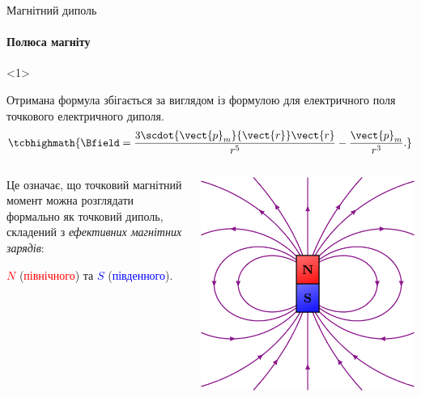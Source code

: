 \documentclass{beamer}
\begin{document}
\begin{frame}{Магнітний диполь}{}
	\framesubtitle<1>{Полюса магніту}
	\begin{onlyenv}
		\begin{block}{}
			Отримана формула збігається за виглядом із формулою для електричного поля точкового електричного диполя.
			\begin{equation*}
				\tcbhighmath{\Bfield = \frac{3\scdot{\vect{p}_m}{\vect{r}}\vect{r}}{r^5} - \frac{\vect{p}_m}{r^3}.}
			\end{equation*}
		\end{block}
		\begin{columns}
			\begin{column}{0.7\linewidth}
				\begin{block}{}\justifying
					Це означає, що точковий
					магнітний момент можна розглядати формально як точковий диполь, складений з \alert{\emph{ефективних магнітних зарядів}}:
					\begin{center}
						\textcolor{red}{$N$} (\textcolor{red}{північного}) та \textcolor{blue}{$S$} (\textcolor{blue}{південного}).
					\end{center}
				\end{block}
			\end{column}
			\begin{column}{0.3\linewidth}\centering
				\includegraphics[width=\linewidth]{magdipole}

\end{column}
\end{columns}
\end{onlyenv}
\end{frame}
\end{document}
